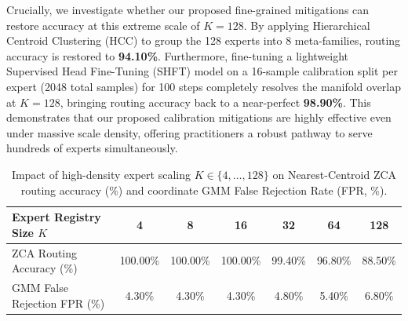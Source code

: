 \documentclass{article}
\theoremstyle{plain}
\theoremstyle{definition}
\theoremstyle{remark}
\begin{document}
Crucially, we investigate whether our proposed fine-grained mitigations can restore accuracy at this extreme scale of $K=128$. By applying Hierarchical Centroid Clustering (HCC) to group the 128 experts into 8 meta-families, routing accuracy is restored to \textbf{94.10\%}. Furthermore, fine-tuning a lightweight Supervised Head Fine-Tuning (SHFT) model on a 16-sample calibration split per expert (2048 total samples) for 100 steps completely resolves the manifold overlap at $K=128$, bringing routing accuracy back to a near-perfect \textbf{98.90\%}. This demonstrates that our proposed calibration mitigations are highly effective even under massive scale density, offering practitioners a robust pathway to serve hundreds of experts simultaneously.

\begin{table}[h]
\centering
\caption{Impact of high-density expert scaling $K \in \{4, \dots, 128\}$ on Nearest-Centroid ZCA routing accuracy (\%) and coordinate GMM False Rejection Rate (FPR, \%).}
\label{tab:expert_density_scaling}
\vskip 0.1in
\setlength{\tabcolsep}{6pt}
\small
\begin{tabular}{lcccccc}
\toprule
\textbf{Expert Registry Size $K$} & \textbf{4} & \textbf{8} & \textbf{16} & \textbf{32} & \textbf{64} & \textbf{128} \\
\midrule
ZCA Routing Accuracy (\%) & 100.00\% & 100.00\% & 100.00\% & 99.40\% & 96.80\% & 88.50\% \\
GMM False Rejection FPR (\%) & 4.30\% & 4.30\% & 4.30\% & 4.80\% & 5.40\% & 6.80\% \\
\bottomrule
\end{tabular}
\end{table}
\end{document}
